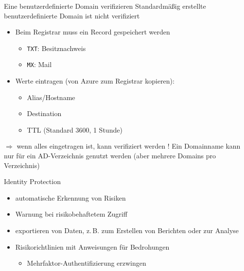 \begin{flashcard}[Definition]{Eine benutzerdefinierte Domain verifizieren}
    Standardmäßig erstellte benutzerdefinierte Domain ist nicht verifiziert
    \begin{itemize}
        \item Beim Registrar muss ein Record gespeichert werden
            \begin{itemize}
                \item \texttt{TXT}: Besitznachweis
                \item \texttt{MX}: Mail
            \end{itemize}
        \item Werte eintragen (von Azure zum Registrar kopieren):
            \begin{itemize}
                \item Alias/Hostname
                \item Destination
                \item TTL (Standard 3600, 1 Stunde)
            \end{itemize}
    \end{itemize}
    $\Rightarrow$ wenn alles eingetragen ist, kann verifiziert werden
    \vspace{1cm}
    ! Ein Domainname kann nur für ein AD-Verzeichnis genutzt werden\newline
    (aber mehrere Domains pro Verzeichnis)
\end{flashcard}


\begin{flashcard}[Definition]{Identity Protection}
    \begin{itemize}
        \item automatische Erkennung von Risiken
        \item Warnung bei risikobehaftetem Zugriff
        \item exportieren von Daten, z.\,B. zum Erstellen von Berichten oder zur Analyse
        \item Risikorichtlinien mit Anweisungen für Bedrohungen
            \begin{itemize}
                \item Mehrfaktor-Authentifizierung erzwingen
            \end{itemize}
    \end{itemize}
\end{flashcard}

